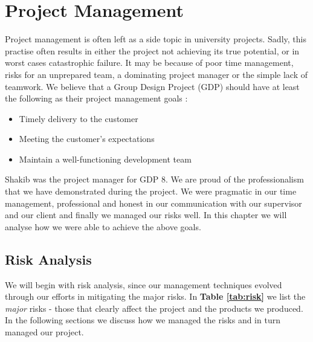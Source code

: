 \chapter{Project Management}
\label{chap:project-management}

Project management is often left as a side topic in university projects. Sadly, this practise often results in either the project not achieving its true potential, or in worst cases catastrophic failure. It may be because of poor time management, risks for an unprepared team, a dominating project manager or the simple lack of teamwork. We believe that a Group Design Project (GDP) should have at least the following as their project management goals \cite{iansommerville2011}:

\begin{itemize}

  \item Timely delivery to the customer
  \item Meeting the customer's expectations
  \item Maintain a well-functioning development team

\end{itemize}

Shakib was the project manager for GDP 8. We are proud of the professionalism that we have demonstrated during the project. We were pragmatic in our time management, professional and honest in our communication with our supervisor and our client and finally we managed our risks well. In this chapter we will analyse how we were able to achieve the above goals.

\section{Risk Analysis}
\label{sec:risk-analysis}

We will begin with risk analysis, since our management techniques evolved through our efforts in mitigating the major risks. In \textbf{Table \ref{tab:risk}} we list the \textit{major} risks - those that clearly affect the project and the products we produced. In the following sections we discuss how we managed the risks and in turn managed our project.

\pagebreak

